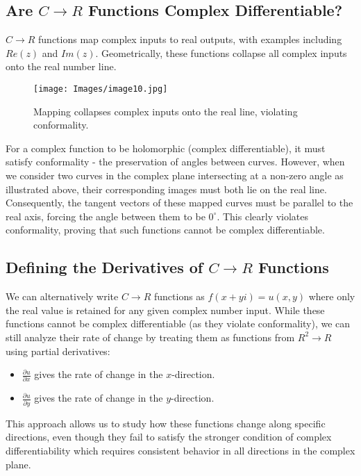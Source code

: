 \documentclass[a4paper,10.5pt]{article}
\begin{document}
\subsection{Are $C \rightarrow R$ Functions Complex Differentiable?}

$C \rightarrow R$ functions map complex inputs to real outputs, with examples including $Re(z)$ and $Im(z)$. Geometrically, these functions collapse all complex inputs onto the real number line.

\begin{figure}[H]
    \centering
    \texttt{[image: Images/image10.jpg]}
    \caption{Mapping collapses complex inputs onto the real line, violating conformality.}
    \label{fig:galaxy}
\end{figure}

For a complex function to be holomorphic (complex differentiable), it must satisfy conformality - the preservation of angles between curves. However, when we consider two curves in the complex plane intersecting at a non-zero angle as illustrated above, their corresponding images must both lie on the real line. Consequently, the tangent vectors of these mapped curves must be parallel to the real axis, forcing the angle between them to be $0^\circ$. This clearly violates conformality, proving that such functions cannot be complex differentiable.

\subsection{Defining the Derivatives of $C \rightarrow R$ Functions}

We can alternatively write $C \rightarrow R$ functions as $f(x+yi)=u(x,y)$ where only the real value is retained for any given complex number input. While these functions cannot be complex differentiable (as they violate conformality), we can still analyze their rate of change by treating them as functions from $R^2 \rightarrow R$ using partial derivatives:

\begin{itemize}
    \item $\frac{\partial u}{\partial x}$ gives the rate of change in the $x$-direction.
    \item $\frac{\partial u}{\partial y}$ gives the rate of change in the $y$-direction.
\end{itemize}

This approach allows us to study how these functions change along specific directions, even though they fail to satisfy the stronger condition of complex differentiability which requires consistent behavior in all directions in the complex plane.
\end{document}
